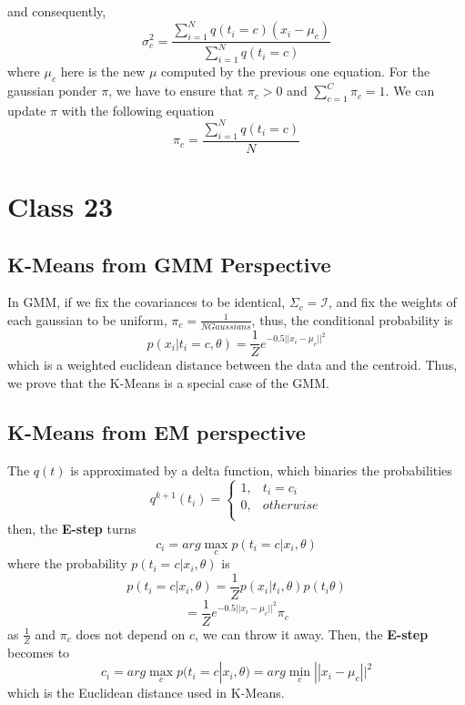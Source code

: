 \documentclass{article}
\begin{document}
\begin{enumerate}
\begin{itemize}
        and consequently, 
        \begin{equation}
            \sigma_c^2 = \frac{\sum_{i=1}^N q(t_i = c)(x_i-\mu_c)}{\sum_{i=1}^N q(t_i = c)}
        \end{equation}
        where $\mu_c$ here is the new $\mu$ computed by the previous one equation. For the gaussian ponder $\pi$, we have to ensure that $\pi_c > 0$ and $\sum_{c=1}^C \pi_c = 1$. We can update $\pi$ with the following equation
        \begin{equation}
            \pi_c = \frac{\sum_{i=1}^N q(t_i = c)}{N}
        \end{equation}
    \end{itemize}
\end{enumerate}

\section{Class 23}
\subsection{K-Means from GMM Perspective}
In GMM, if we fix the covariances to be identical, $\Sigma_c = \mathcal{I}$, and fix the weights of each gaussian to be uniform, $\pi_c = \frac{1}{N Gaussians}$, thus, the conditional probability is
\begin{equation}
    p(x_i|t_i = c, \theta) = \frac{1}{Z} e^{-0.5||x_i - \mu_c||^2}
\end{equation}
which is a weighted euclidean distance between the data and the centroid. Thus, we prove that the K-Means is a special case of the GMM.

\subsection{K-Means from EM perspective}
The $q(t)$ is approximated by a delta function, which binaries the probabilities
\begin{equation}
    q^{k+1}(t_i) = \begin{cases}
    1, & t_i = c_i\\
    0, & otherwise\\
    \end{cases}
\end{equation}
then, the \textbf{E-step} turns
\begin{equation}
    c_i = arg \max_c p(t_i = c|x_i, \theta)
\end{equation}
where the probability $p(t_i = c|x_i, \theta)$ is 
\begin{equation}
    p(t_i = c|x_i, \theta) = \frac{1}{Z}p(x_i|t_i, \theta)p(t_i\theta)
\end{equation}
\begin{equation}
    = \frac{1}{Z}e^{-0.5||x_i - \mu_c||^2}\pi_c
\end{equation}
as $\frac{1}{Z}$ and $\pi_c$ does not depend on $c$, we can throw it away. Then, the \textbf{E-step} becomes to
\begin{equation}
    c_i = arg \max_c p(t_i = c|x_i, \theta) = arg \min_c ||x_i - \mu_c||^2
\end{equation}
which is the Euclidean distance used in K-Means.
\end{document}
